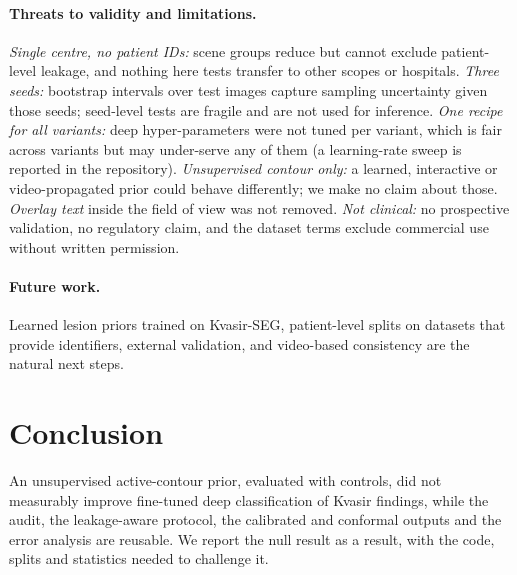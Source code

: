 \paragraph{Threats to validity and limitations.}
\emph{Single centre, no patient IDs:} scene groups reduce but cannot exclude patient-level leakage, and nothing here tests transfer to other scopes or hospitals.
\emph{Three seeds:} bootstrap intervals over test images capture sampling uncertainty given those seeds; seed-level tests are fragile and are not used for inference.
\emph{One recipe for all variants:} deep hyper-parameters were not tuned per variant, which is fair across variants but may under-serve any of them (a learning-rate sweep is reported in the repository).
\emph{Unsupervised contour only:} a learned, interactive or video-propagated prior could behave differently; we make no claim about those.
\emph{Overlay text} inside the field of view was not removed.
\emph{Not clinical:} no prospective validation, no regulatory claim, and the dataset terms exclude commercial use without written permission.

\paragraph{Future work.}
Learned lesion priors trained on Kvasir-SEG, patient-level splits on datasets that provide identifiers, external validation, and video-based consistency are the natural next steps.

\section{Conclusion}
An unsupervised active-contour prior, evaluated with controls, did not measurably improve fine-tuned deep classification of Kvasir findings, while the audit, the leakage-aware protocol, the calibrated and conformal outputs and the error analysis are reusable.
We report the null result as a result, with the code, splits and statistics needed to challenge it.
